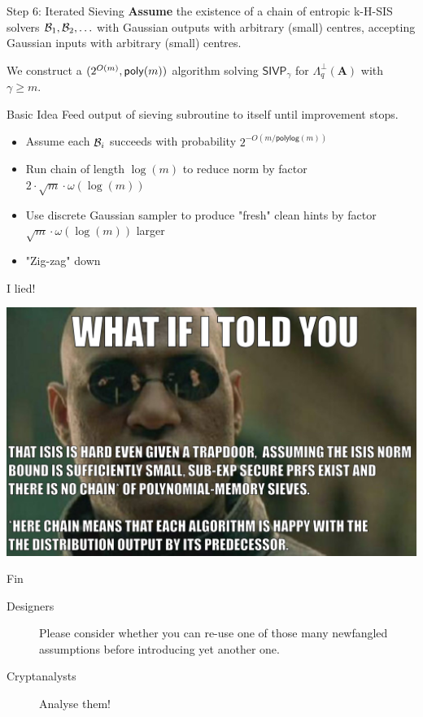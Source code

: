 \documentclass[xcolor=table,10pt,aspectratio=169]{beamer}
\renewcommand{\vec}[1]{\ensuremath{\mathbf{#1}}\xspace}
\providecommand{\mat}[1]{\ensuremath{\vec{#1}}\xspace}
\newcommand{\SIVP}{\ensuremath{\mathsf{SIVP}}\xspace}
\begin{document}
\begin{frame}[label={sec:org1c14394}]{Step 6: Iterated Sieving}
\textbf{Assume} the existence of a chain of entropic k-H-SIS solvers \(\mathcal{B}_1, \mathcal{B}_2, \ldots\) with Gaussian outputs with arbitrary (small) centres, accepting Gaussian inputs with arbitrary (small) centres.

We construct a \((2^{O(m)}, \poly[m])\) algorithm solving \(\SIVP_\gamma\) for \(\Lambda_q^\bot(\mat{A})\) with \(\gamma \geq m\).

\begin{block}{Basic Idea}
Feed output of sieving subroutine to itself until improvement stops.
\end{block}

\begin{itemize}
\item Assume each \(\mathcal{B}_{i}\) succeeds with probability \(2^{-O(m/\mathsf{polylog}(m))}\)
\item Run chain of length \(\log(m)\) to reduce norm by factor \(2 \cdot \sqrt{m} \cdot \omega(\log(m))\)
\item Use discrete Gaussian sampler to produce "fresh" clean hints by factor \(\sqrt{m} \cdot \omega(\log(m))\) larger
\item "Zig-zag" down
\end{itemize}
\end{frame}

\begin{frame}[label={sec:org202f007}]{I lied!}
\begin{center}
\includegraphics[keepaspectratio,height=.9\textheight]{./sis-with-hints-real.jpg}
\end{center}
\end{frame}

\begin{frame}[label={sec:orgc779573},standout]{Fin}
\begin{center}
\huge

\begin{description}
\item[{Designers}] Please consider whether you can re-use one of those many newfangled assumptions before introducing yet another one.

\item[{Cryptanalysts}] Analyse them!
\end{description}
\end{center}
\end{frame}
\end{document}
